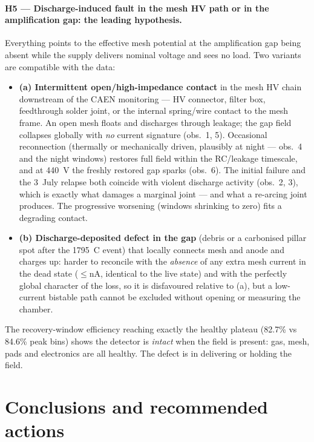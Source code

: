 \documentclass[11pt,a4paper]{article}
\begin{document}
\paragraph{H5 --- Discharge-induced fault in the mesh HV path or in the
amplification gap: the leading hypothesis.} Everything points to the
effective mesh potential at the amplification gap being absent while the
supply delivers nominal voltage and sees no load. Two variants are
compatible with the data:
\begin{itemize}
  \item \textbf{(a) Intermittent open/high-impedance contact} in the mesh HV
  chain downstream of the CAEN monitoring --- HV connector, filter box,
  feedthrough solder joint, or the internal spring/wire contact to the mesh
  frame. An open mesh floats and discharges through leakage; the gap field
  collapses globally with \emph{no} current signature (obs.~1, 5). Occasional
  reconnection (thermally or mechanically driven, plausibly at night ---
  obs.~4 and the night windows) restores full field within the RC/leakage
  timescale, and at 440~V the freshly restored gap sparks (obs.~6). The
  initial failure and the 3~July relapse both coincide with violent
  discharge activity (obs.~2, 3), which is exactly what damages a marginal
  joint --- and what a re-arcing joint produces. The progressive worsening
  (windows shrinking to zero) fits a degrading contact.
  \item \textbf{(b) Discharge-deposited defect in the gap} (debris or a
  carbonised pillar spot after the 1795~\textmu C event) that locally
  connects mesh and anode and charges up: harder to reconcile with the
  \emph{absence} of any extra mesh current in the dead state ($\leq$nA,
  identical to the live state) and with the perfectly global character of
  the loss, so it is disfavoured relative to (a), but a low-current
  bistable path cannot be excluded without opening or measuring the chamber.
\end{itemize}

The recovery-window efficiency reaching exactly the healthy plateau (82.7\%
vs 84.6\% peak bins) shows the detector is \emph{intact} when the field is
present: gas, mesh, pads and electronics are all healthy. The defect is in
delivering or holding the field.

\section{Conclusions and recommended actions}
\label{sec:conclusions}
\end{document}
